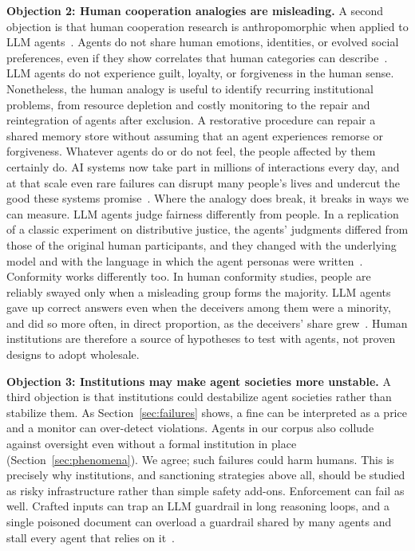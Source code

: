 \documentclass[runningheads]{llncs}
\begin{document}
\textbf{Objection 2: Human cooperation analogies are misleading.} A second objection is that human cooperation research is anthropomorphic when applied to LLM agents~\citep{shapiraCleverHansNeural2024}. Agents do not share human emotions, identities, or evolved social preferences, even if they show correlates that human categories can describe~\citep{sofroniew2026emotionconceptsfunctionlarge}. LLM agents do not experience guilt, loyalty, or forgiveness in the human sense. Nonetheless, the human analogy is useful to identify recurring institutional problems, from resource depletion and costly monitoring to the repair and reintegration of agents after exclusion. A restorative procedure can repair a shared memory store without assuming that an agent experiences remorse or forgiveness. Whatever agents do or do not feel, the people affected by them certainly do. AI systems now take part in millions of interactions every day, and at that scale even rare failures can disrupt many people's lives and undercut the good these systems promise~\mbox{\citep{dafoe2021cooperative}}. Where the analogy does break, it breaks in ways we can measure. LLM agents judge fairness differently from people. In a replication of a classic experiment on distributive justice, the agents' judgments differed from those of the original human participants, and they changed with the underlying model and with the language in which the agent personas were written~\mbox{\citep{deck2026normcore}}. Conformity works differently too. In human conformity studies, people are reliably swayed only when a misleading group forms the majority. LLM agents gave up correct answers even when the deceivers among them were a minority, and did so more often, in direct proportion, as the deceivers' share grew~\mbox{\citep{wu2026adversarial}}. Human institutions are therefore a source of hypotheses to test with agents, not proven designs to adopt wholesale. 

\textbf{Objection 3: Institutions may make agent societies more unstable.} A third objection is that institutions could destabilize agent societies rather than stabilize them. As Section~\mbox{\ref{sec:failures}} shows, a fine can be interpreted as a price and a monitor can over-detect violations. Agents in our corpus also collude against oversight even without a formal institution in place (Section~\mbox{\ref{sec:phenomena}}). We agree; such failures could harm humans. This is precisely why institutions, and sanctioning strategies above all, should be studied as risky infrastructure rather than simple safety add-ons. Enforcement can fail as well. Crafted inputs can trap an LLM guardrail in long reasoning loops, and a single poisoned document can overload a guardrail shared by many agents and stall every agent that relies on it~\mbox{\citep{zhou2026guardrail}}. 
\end{document}
